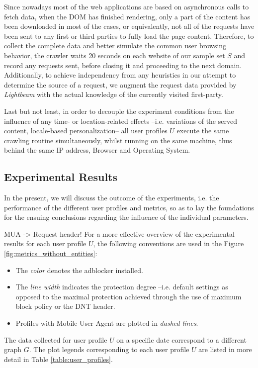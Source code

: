 \documentclass{sig-alternate}
\begin{document}
Since nowadays most of the web applications are based on asynchronous calls to fetch data, when the DOM has finished rendering, only a part of the content has been downloaded in most of the cases, or equivalently, not all of the requests have been sent to any first or third parties to fully load the page content. Therefore, to collect the complete data and better simulate the common user browsing behavior, the crawler waits 20 seconds on each website of our sample set $S$ and record any requests sent, before closing it and proceeding to the next domain. Additionally, to achieve independency from any heuristics in our attempt to determine the source of a request, we augment the request data provided by \textit{Lightbeam} with the actual knowledge of the currently visited first-party.

Last but not least, in order to decouple the experiment conditions from the influence of any time- or location-related effects --i.e. variations of the served content, locale-based personalization-- all user profiles $U$ execute the same crawling routine simultaneously, whilst running on the same machine, thus behind the same IP address, Browser and Operating System.

\subsection{Experimental Results}
{\color{blue}In the present, we will discuss the outcome of the experiments, i.e. the performance of the different user profiles and metrics, so as to lay the foundations for the ensuing conclusions regarding the influence of the individual parameters.}

{\color{red}MUA -> Request header!}
For a more effective overview of the experimental results for each user profile $U$, the following conventions are used in the Figure \ref{fig:metrics_without_entities}:
\begin{itemize}
 \item The \textit{color} denotes the adblocker installed.
 \item The \textit{line width} indicates the protection degree --i.e. default settings as opposed to the maximal protection achieved through the use of maximum block policy or the DNT header.
 \item Profiles with Mobile User Agent are plotted in \textit{dashed lines}.
\end{itemize}
{\color{blue}The data collected for user profile $U$ on a specific date correspond to a different graph $G$.} The plot legends corresponding to each user profile $U$ are listed in more detail in Table \ref{table:user_profiles}.
\end{document}
